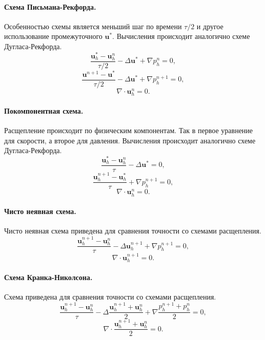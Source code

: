 \documentclass[12pt]{article}
\begin{document}
\paragraph{Схема Письмана-Рекфорда.} Особенностью схемы является меньший шаг по времени $\tau/2$ и другое использование промежуточного ${\bm u}^*$. Вычисления происходит аналогично схеме Дугласа-Рекфорда.
$$
\frac{{\bm u}_h^{*}-{\bm u}_h^n}{\tau/2} - \Delta {\bm u}^{*}+\nabla p_h^n=0,
$$
$$
\frac{{\bm u}^{n+1}-{\bm u}^{*}}{\tau/2} - \Delta {\bm u}^{*}+\nabla p_h^{n+1}=0,
$$
$$
\nabla \cdot {\bm u}_h^n = 0.
$$

\paragraph{Покомпонентная схема.} Расщепление происходит по физическим компонентам. Так в первое уравнение для скорости, а второе для давления. Вычисления происходит аналогично схеме Дугласа-Рекфорда.
$$
\frac{{\bm u}_h^{*}-{\bm u}_h^n}{\tau} - \Delta{\bm u}^{*}=0,
$$
$$
\frac{{\bm u}_h^{n+1}-{\bm u}_h^{*}}{\tau} + \nabla p_h^{n+1}=0,
$$
$$
\nabla \cdot {\bm u}_h^n = 0.
$$


\paragraph{Чисто неявная схема.} Чисто неявная схема приведена для сравнения точности со схемами расщепления.
$$
\frac{{\bm u}_h^{n+1}-{\bm u}_h^n}{\tau} - \Delta {\bm u}_h^{n+1}+\nabla p_h^{n+1} = 0,
$$
$$
\nabla \cdot {\bm u}_h^{n+1} = 0.
$$
\paragraph{Схема Кранка-Николсона.} Схема приведена для сравнения точности со схемами расщепления.
$$
\frac{{\bm u}_h^{n+1}-{\bm u}_h^n}{\tau} - \Delta \frac{{\bm u}_h^{n+1}+{\bm u}_h^n}{2}+\nabla \frac{p_h^{n+1}+p_h^n}{2}=0,
$$
$$
\nabla \cdot \frac{{\bm u}_h^{n+1}+{\bm u}_h^{n}}{2}=0.
$$
\end{document}
